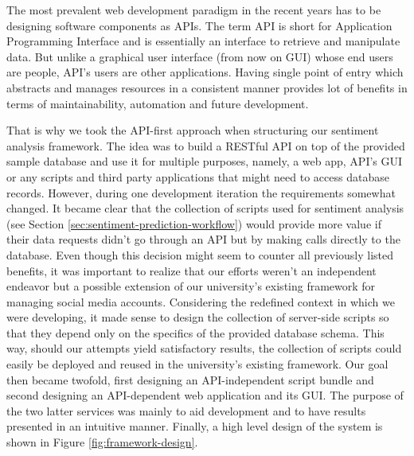 The most prevalent web development paradigm in the recent years has to be designing software components as APIs. 
The term API is short for Application Programming Interface and is essentially an interface to retrieve and manipulate data. But unlike a graphical user interface (from now on GUI) whose end users are people, API's users are other applications. 
Having single point of entry which abstracts and manages resources in a consistent manner provides lot of benefits in terms of maintainability, automation and future development.

That is why we took the API-first approach when structuring our sentiment analysis framework. 
The idea was to build a RESTful API on top of the provided sample database and use it for multiple purposes, namely, a web app, API's GUI or any scripts and third party applications that might need to access database records. 
However, during one development iteration the requirements somewhat changed.
It became clear that the collection of scripts used for sentiment analysis (see Section \ref{sec:sentiment-prediction-workflow}) would provide more value if their data requests didn't go through an API but by making calls directly to the database. 
Even though this decision might seem to counter all previously listed benefits, it was important to realize that our efforts weren't an independent endeavor but a possible extension of our university's existing framework for managing social media accounts. 
Considering the redefined context in which we were developing, it made sense to design the collection of server-side scripts so that they depend only on the specifics of the provided database schema.
This way, should our attempts yield satisfactory results, the collection of scripts could easily be deployed and reused in the university's existing framework. 
Our goal then became twofold, first designing an API-independent script bundle and second designing an API-dependent web application and its GUI. 
The purpose of the two latter services was mainly to aid development and to have results presented in an intuitive manner.
Finally, a high level design of the system is shown in Figure \ref{fig:framework-design}.

